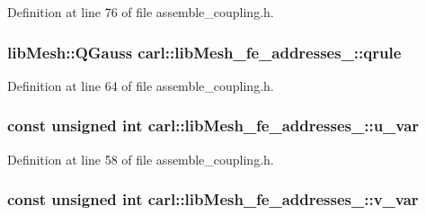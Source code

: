 Definition at line 76 of file assemble\+\_\+coupling.\+h.

\hypertarget{classcarl_1_1lib_mesh__fe__addresses__3_ab65bb9f83a2b413504d666ad68544fa6}{}
\subsubsection[{qrule}]{\setlength{\rightskip}{0pt plus 5cm}lib\+Mesh\+::\+Q\+Gauss carl\+::lib\+Mesh\+\_\+fe\+\_\+addresses\+\_\+::qrule}\label{classcarl_1_1lib_mesh__fe__addresses__3_ab65bb9f83a2b413504d666ad68544fa6}


Definition at line 64 of file assemble\+\_\+coupling.\+h.

\hypertarget{classcarl_1_1lib_mesh__fe__addresses__3_a66548903d66794e618d176376e101636}{}
\subsubsection[{u\+\_\+var}]{\setlength{\rightskip}{0pt plus 5cm}const unsigned int carl\+::lib\+Mesh\+\_\+fe\+\_\+addresses\+\_\+::u\+\_\+var}\label{classcarl_1_1lib_mesh__fe__addresses__3_a66548903d66794e618d176376e101636}


Definition at line 58 of file assemble\+\_\+coupling.\+h.

\hypertarget{classcarl_1_1lib_mesh__fe__addresses__3_a9968e0844a5f7881b357a43f9c80d271}{}
\subsubsection[{v\+\_\+var}]{\setlength{\rightskip}{0pt plus 5cm}const unsigned int carl\+::lib\+Mesh\+\_\+fe\+\_\+addresses\+\_\+::v\+\_\+var}\label{classcarl_1_1lib_mesh__fe__addresses__3_a9968e0844a5f7881b357a43f9c80d271}


